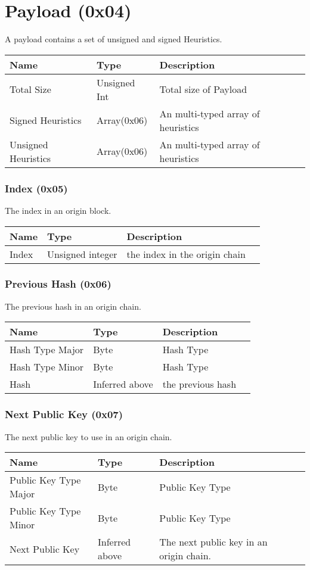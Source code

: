 \documentclass[11pt]{article}
\begin{document}
\section{Payload (0x04)}
A payload contains a set of unsigned and signed Heuristics.
\begin{center}
\begin{tabular}{ |l|l|l|l| } 
\hline
\textbf{Name} & \textbf{Type} & \textbf{Description}\\
\hline
Total Size & Unsigned Int & Total size of Payload \\ 
Signed Heuristics & Array(0x06) & An multi-typed array of heuristics\\  
Unsigned Heuristics & Array(0x06) & An multi-typed array of heuristics\\  

 
\hline
\end{tabular}
\end{center}
\subsubsection*{Index (0x05)}
The index in an origin block.
\begin{center}
\begin{tabular}{ |l|l|l|l| } 
\hline
\textbf{Name} & \textbf{Type} & \textbf{Description}\\
\hline
Index & Unsigned integer & the index in the origin chain\\  
\hline
\end{tabular}
\end{center}
\subsubsection*{Previous Hash (0x06)}
The previous hash in an origin chain.
\begin{center}
\begin{tabular}{ |l|l|l|l| } 
\hline
\textbf{Name} & \textbf{Type} & \textbf{Description}\\
\hline
Hash Type Major & Byte & Hash Type \\ 
Hash Type Minor & Byte & Hash Type\\ 
Hash & Inferred above & the previous hash\\  
\hline
\end{tabular}
\end{center}
\subsubsection*{Next Public Key (0x07)}
The next public key to use in an origin chain.
\begin{center}
\begin{tabular}{ |l|l|l|l| } 
\hline
\textbf{Name} & \textbf{Type} & \textbf{Description}\\
\hline
Public Key Type Major & Byte & Public Key Type \\ 
Public Key Type Minor & Byte & Public Key Type\\ 
Next Public Key & Inferred above & The next public key in an origin chain.\\  
\hline
\end{tabular}
\end{center}
\end{document}
